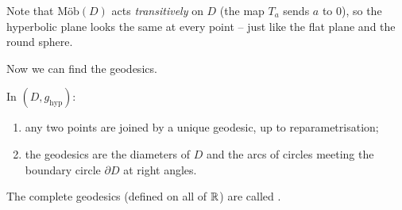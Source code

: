 \documentclass[a4paper]{scrartcl}
\newcommand{\Mob}{\text{M\"ob}}
\begin{document}
Note that $\Mob(D)$ acts \emph{transitively} on $D$ (the map $T_a$ sends $a$ to $0$), so the hyperbolic plane looks the same at every point -- just like the flat plane and the round sphere.

Now we can find the geodesics.

\begin{proposition}\label{prop:discgeodesics}
    In $(D, g_{\mathrm{hyp}})$:
    \begin{enumerate}[label=(\roman*)]
        \item any two points are joined by a unique geodesic, up to reparametrisation;
        \item the geodesics are the diameters of $D$ and the arcs of circles meeting the boundary circle $\partial D$ at right angles.
    \end{enumerate}
    The complete geodesics (defined on all of $\mathbb{R}$) are called .
\end{proposition}
\begin{center}
\end{center}
\end{document}
